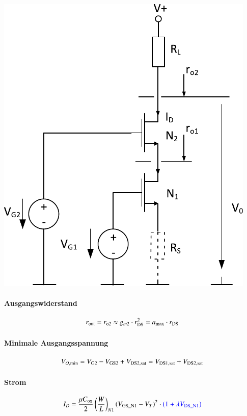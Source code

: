 \begin{minipage}[t]{0.3\columnwidth}
    \includegraphics[width=\columnwidth, align=t]{images/05_stromquelle_kaskode.pdf}
\end{minipage}
\hfill
\begin{minipage}[t]{0.62\columnwidth}
    \paragraph{Ausgangswiderstand}

    \vspace{-0.2cm}
    \[
        r_{\rm out} = r_{\rm o2} \approx g_{m2} \cdot r_{\rm DS}^2 = a_{\rm max} \cdot r_{\rm DS}
    \]
            

    \paragraph{Minimale Ausgangsspannung}

    \vspace{-0.5cm}
    \[
        V_{O, \rm min} = V_{\rm G2} - V_{\rm GS2} + V_{\rm DS2, sat} =  V_{\rm DS1, sat} + V_{\rm DS2, sat}
    \]


    \paragraph{Strom}

    \vspace{-0.4cm}
    \[
        I_D = \frac{\mu C_{\rm ox}}{2} \left( \frac{W}{L}\right)_{N1} (V_{\rm GS\_N1} - V_T)^2 \cdot {\color{blue}(1 + \lambda V_{\rm DS\_N1})}
    \]
\end{minipage}


